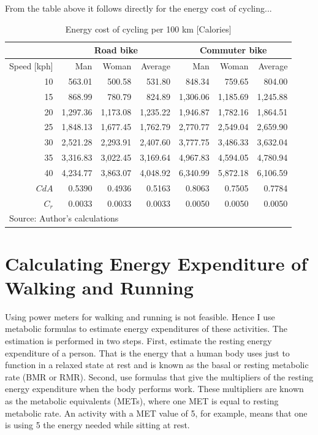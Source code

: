 \documentclass{article}[12pt,letterpaper]
\begin{document}
From the table above it follows directly for the energy cost of cycling...
\begin{table}[ht]
\begin{center}
\caption{Energy cost of cycling per 100 km [Calories]}
\label{tab:bike-work-vs-speed}
\begin{tabular}{|r|r|r|r|r|r|r|}
\hline
& \multicolumn{3}{|c|}{Road bike} & \multicolumn{3}{|c|}{Commuter bike} \\
\hline
Speed [kph] & Man & Woman & Average & Man & Woman & Average \\
\hline
10 &	563.01 &	500.58 &	531.80 &	848.34 &	759.65 &	804.00 \\
15 &	868.99 &	780.79 &	824.89 &	1,306.06 &	1,185.69 &	1,245.88 \\
20 &	1,297.36 & 	1,173.08 &	1,235.22 &	1,946.87 &	1,782.16 &	1,864.51 \\
25 &	1,848.13 &	1,677.45 &	1,762.79 &	2,770.77 &	2,549.04 &	2,659.90 \\
30 &	2,521.28 &	2,293.91 &	2,407.60 &	3,777.75 &	3,486.33 &	3,632.04 \\
35 &	3,316.83 &	3,022.45 &	3,169.64 &	4,967.83 &	4,594.05 &	4,780.94 \\
40 &	4,234.77 &	3,863.07 &	4,048.92 &	6,340.99 &	5,872.18 &	6,106.59 \\
\hline
$CdA$ & 0.5390 & 0.4936 & 0.5163 & 0.8063 & 0.7505 & 0.7784\\
$C_r$ & 0.0033 & 0.0033	& 0.0033 & 0.0050 & 0.0050 & 0.0050\\
\hline
\multicolumn{7}{l}{Source: Author's calculations}\\
\end{tabular}
\end{center}
\end{table}


\section{Calculating Energy Expenditure of Walking and Running}
Using power meters for walking and running is not feasible. Hence I use metabolic formulas to estimate energy expenditures of these activities. The estimation is performed in two steps. First, estimate the resting energy expenditure of a person. That is the energy that a human body uses just to function in a relaxed state at rest and is known as the basal or resting metabolic rate (BMR or RMR). Second, use formulas that give the multipliers of the resting energy expenditure when the body performs work. These multipliers are known as the metabolic equivalents (METs), where one MET is equal to resting metabolic rate. An activity with a MET value of 5, for example, means that one is using 5 the energy needed while sitting at rest.
\end{document}
